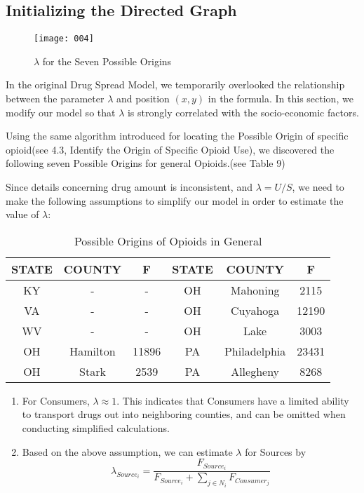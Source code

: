 \subsection{Initializing the Directed Graph}
\begin{wrapfigure}{r}{0.35\linewidth} %
	\begin{center}
		\texttt{[image: 004]}
	\end{center}
	\caption{$\lambda$ for the Seven Possible Origins}
\end{wrapfigure}

In the original Drug Spread Model, we temporarily overlooked the relationship between the parameter $\lambda$ and position $(x,y)$ in the formula. In this section, we modify our model so that $\lambda$ is strongly correlated with the socio-economic factors. 

Using the same algorithm introduced for locating the Possible Origin of specific opioid(see 4.3, Identify the Origin of Specific Opioid Use), we discovered the following seven Possible Origins for general Opioids.(see Table 9)

Since details concerning drug amount is inconsistent, and $\lambda=U/S$, we need to make the following assumptions to simplify our model in order to estimate the value of $\lambda$:

\begin{table}[H]
	\centering
	\begin{tabular}{|c|c|c||c|c|c|}
		\hline
		\rowcolor[HTML]{656565} 
		{\color[HTML]{FFFFFF} \textbf{STATE}} & {\color[HTML]{FFFFFF} \textbf{COUNTY}} & {\color[HTML]{FFFFFF} \textbf{F}} &{\color[HTML]{FFFFFF} \textbf{STATE}} & {\color[HTML]{FFFFFF} \textbf{COUNTY}} & {\color[HTML]{FFFFFF} \textbf{F}}\\ \hline
		KY & - & - &OH & Mahoning & 2115 \\ \hline
		VA & - & - &OH & Cuyahoga & 12190\\ \hline
		WV & - & - &OH& Lake &3003 \\ \hline
		OH & Hamilton & 11896 &PA & Philadelphia & 23431 \\ \hline
		OH & Stark & 2539 & PA & Allegheny & 8268 \\ \hline
	\end{tabular}
	\centering
	\caption{Possible Origins of Opioids in General}
\end{table}



\begin{enumerate}
	\item For Consumers, $\lambda \approx 1$. This indicates that Consumers have a limited ability to transport drugs out into neighboring counties, and can be omitted when conducting simplified calculations.
	
	\item Based on the above assumption, we can estimate $\lambda$ for Sources by
	\begin{equation}
	\lambda_{Source_i}=\frac{F_{Source_i}}{F_{Source_i}+\sum_{j\in N_i} F_{Consumer_j}}
	\end{equation} 
\end{enumerate}

